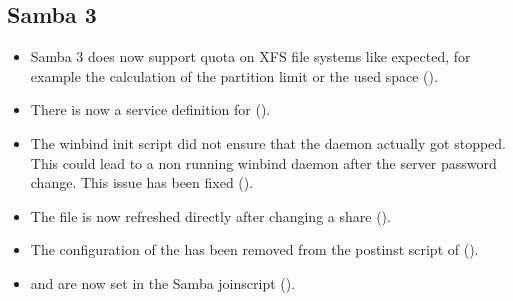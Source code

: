\subsection{Samba 3}
\begin{itemize}
\item Samba 3 does now support quota on XFS file systems like expected, for example the calculation of the partition limit or the used space ().
\item There is now a service definition for  ().
\item The winbind init script did not ensure that the daemon actually got stopped. This could lead
 to a non running winbind daemon after the server password change. This issue has been fixed
 ().
\item The file  is now refreshed directly after changing a share ().
\item The configuration of the  has been removed from
the postinst script of  ().
\item {} and  are now set in the Samba joinscript ().
\end{itemize}

